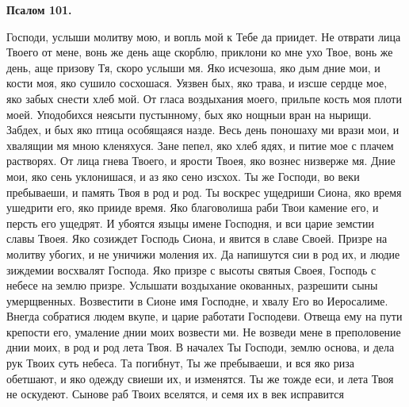 \medskip


\bfseries Псалом 101.\normalfont{}\nopagebreak


Господи, услыши молитву мою, и вопль мой к Тебе да приидет. Не отврати лица Твоего от мене, вонь же день аще скорблю, приклони ко мне ухо Твое, вонь же день, аще призову Тя, скоро услыши мя. Яко исчезоша, яко дым дние мои, и кости моя, яко сушило сосхошася. Уязвен бых, яко трава, и изсше сердце мое, яко забых снести хлеб мой. От гласа воздыхания моего, прильпе кость моя плоти моей. Уподобихся неясыти пустынному, бых яко нощныи вран на нырищи. Забдех, и бых яко птица особящаяся назде. Весь день поношаху ми врази мои, и хвалящии мя мною кленяхуся. Зане пепел, яко хлеб ядях, и питие мое с плачем растворях. От лица гнева Твоего, и ярости Твоея, яко вознес низверже мя. Дние мои, яко сень уклонишася, и аз яко сено изсхох. Ты же Господи, во веки пребываеши, и память Твоя в род и род. Ты воскрес ущедриши Сиона, яко время ушедрити его, яко прииде время. Яко благоволиша раби Твои камение его, и персть его ущедрят. И убоятся языцы имене Господня, и вси царие земстии славы Твоея. Яко созиждет Господь Сиона, и явится в славе Своей. Призре на молитву убогих, и не уничижи моления их. Да напишутся сии в род их, и людие зиждемии восхвалят Господа. Яко призре с высоты святыя Своея, Господь с небесе на землю призре. Услышати воздыхание окованных, разрешити сыны умерщвенных. Возвестити в Сионе имя Господне, и хвалу Его во Иеросалиме. Внегда собратися людем вкупе, и царие работати Господеви. Отвеща ему на пути крепости его, умаление днии моих возвести ми. Не возведи мене в преполовение днии моих, в род и род лета Твоя. В началех Ты Господи, землю основа, и дела рук Твоих суть небеса. Та погибнут, Ты же пребываеши, и вся яко риза обетшают, и яко одежду свиеши их, и изменятся. Ты же тожде еси, и лета Твоя не оскудеют. Сынове раб Твоих вселятся, и семя их в век исправится


